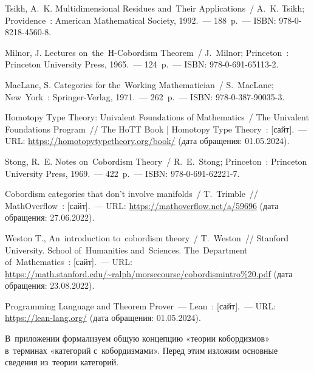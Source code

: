 \documentclass[a4paper,oneside]{article}
\begin{document}
\begin{thebibliography}{99}
 Tsikh, A.~K. Multidimensional Residues and~Their Applications~/ A.~K. Tsikh; Providence~: American Mathematical Society, 1992.~— 188~p.~— ISBN: 978-0-8218-4560-8.

 Milnor, J. Lectures on~the~H-Cobordism Theorem~/ J.~Milnor; Princeton~: Princeton University Press, 1965.~— 124~p.~— ISBN: 978-0-691-65113-2.

 MacLane, S. Categories for the~Working Mathematician~/ S.~MacLane; New~York~: Springer-Verlag, 1971.~— 262~p.~— ISBN: 978-0-387-90035-3.

 Homotopy Type Theory: Univalent Foundations of Mathematics~/ The {Uni\-va\-lent} Foundations Program~//
The HoTT Book | Homotopy Type {The\-o\-ry}~: [сайт].~— URL: \url{https://homotopytypetheory.org/book/} (дата обращения: 01.05.2024).

 Stong, R.~E. Notes on~Cobordism Theory~/ R.~E.~Stong; Princeton~: Princeton University Press, 1969.~— 422~p.~— ISBN: 978-0-691-62221-7.

 Cobordism categories that don’t involve manifolds~/ T.~Trimble~//
{Math\-Over\-flow}~: [сайт].~— URL: \url{https://mathoverflow.net/a/59696} (дата обращения: 27.06.2022).

 Weston T., An~introduction to~cobordism theory~/ T.~Weston~//
{Stan\-ford} University. School of~Humanities and~Sciences.
The~Department of~{Math\-e\-mat\-ics}~: [сайт].~— URL: \url{https://math.stanford.edu/~ralph/morsecourse/cobordismintro%20.pdf} (дата обращения: 23.08.2022).

 Programming Language and Theorem Prover~— Lean~: [сайт].~— URL: \url{https://lean-lang.org/} (дата обращения: 01.05.2024).
\end{thebibliography}

\label{TheEnd}
\pagebreak

\renewcommand*{\theHsection}{appendix.\arabic{section}}
\renewcommand{\thesection}{\Alph{section}}

\setcounter{section}{1}
\setcounter{subsection}{0}

В~приложении формализуем общую концепцию «теории кобордизмов» в~терминах «категорий с~кобордизмами».
Перед этим изложим основные сведения из~теории категорий.







\pagebreak
\end{document}
